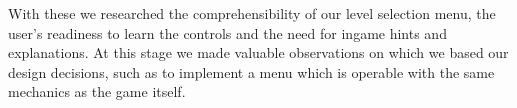 \documentclass{chi-ext}
\begin{document}
With these we researched the comprehensibility of our level selection menu, the user's readiness to learn the controls and the need for ingame hints and explanations. At this stage we made valuable observations on which we based our design decisions, such as to implement a menu which is operable with the same mechanics as the game itself. 
\end{document}
